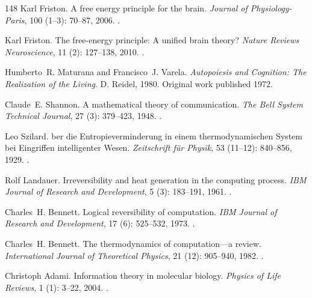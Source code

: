 \documentclass[11pt]{article}
\theoremstyle{plain}
\theoremstyle{definition}
\theoremstyle{remark}
\begin{document}
\begin{thebibliography}{148}
Karl Friston.
\newblock A free energy principle for the brain.
\newblock \emph{Journal of Physiology-Paris}, 100 (1--3):
  70--87, 2006.
\newblock {}.

Karl Friston.
\newblock The free-energy principle: A unified brain theory?
\newblock \emph{Nature Reviews Neuroscience}, 11 (2):
  127--138, 2010.
\newblock {}.

Humberto~R. Maturana and Francisco~J. Varela.
\newblock \emph{Autopoiesis and Cognition: The Realization of the Living}.
\newblock D. Reidel, 1980.
\newblock Original work published 1972.

Claude~E. Shannon.
\newblock A mathematical theory of communication.
\newblock \emph{The Bell System Technical Journal}, 27 (3):
  379--423, 1948.
\newblock {}.

Leo Szilard.
ber die {Entropieverminderung} in einem thermodynamischen
  {System} bei {Eingriffen} intelligenter {Wesen}.
\newblock \emph{Zeitschrift f{\"u}r Physik}, 53 (11--12):
  840--856, 1929.
\newblock {}.

Rolf Landauer.
\newblock Irreversibility and heat generation in the computing process.
\newblock \emph{IBM Journal of Research and Development}, 5
  (3): 183--191, 1961.
\newblock {}.

Charles~H. Bennett.
\newblock Logical reversibility of computation.
\newblock \emph{IBM Journal of Research and Development}, 17
  (6): 525--532, 1973.
\newblock {}.

Charles~H. Bennett.
\newblock The thermodynamics of computation---a review.
\newblock \emph{International Journal of Theoretical Physics}, 21
  (12): 905--940, 1982.
\newblock {}.

Christoph Adami.
\newblock Information theory in molecular biology.
\newblock \emph{Physics of Life Reviews}, 1 (1): 3--22, 2004.
\newblock {}.


\end{thebibliography}
\end{document}
